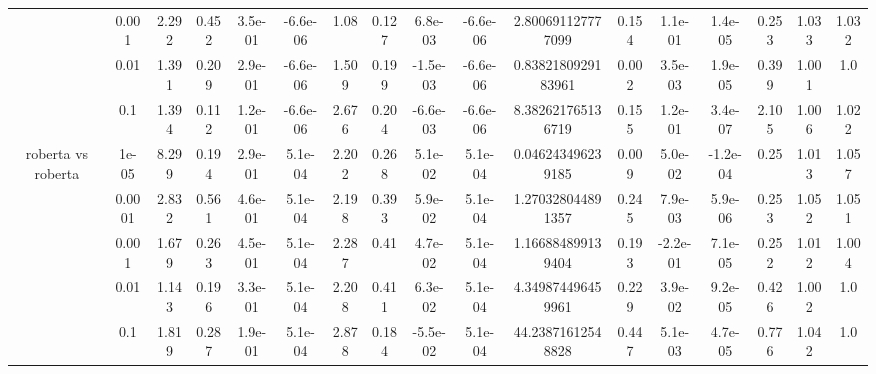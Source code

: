 \begin{tabular}{|c|c|c|c|c|c|c|c|c|c|c|c|c|c|c|c|c|}
 & 0.001 & 2.292 & 0.452 & 3.5e-01 & -6.6e-06 & 1.08 & 0.127 & 6.8e-03 & -6.6e-06 & 2.800691127777099 & 0.154 & 1.1e-01 & 1.4e-05 & 0.253 & 1.033 & 1.032 \\
 & 0.01 & 1.391 & 0.209 & 2.9e-01 & -6.6e-06 & 1.509 & 0.199 & -1.5e-03 & -6.6e-06 & 0.8382180929183961 & 0.002 & 3.5e-03 & 1.9e-05 & 0.399 & 1.001 & 1.0 \\
 & 0.1 & 1.394 & 0.112 & 1.2e-01 & -6.6e-06 & 2.676 & 0.204 & -6.6e-03 & -6.6e-06 & 8.382621765136719 & 0.155 & 1.2e-01 & 3.4e-07 & 2.105 & 1.006 & 1.022 \\
\hline
\multirow{5}{*}{roberta  vs roberta } & 1e-05 & 8.299 & 0.194 & 2.9e-01 & 5.1e-04 & 2.202 & 0.268 & 5.1e-02 & 5.1e-04 & 0.046243496239185 & 0.009 & 5.0e-02 & -1.2e-04 & 0.25 & 1.013 & 1.057 \\
 & 0.0001 & 2.832 & 0.561 & 4.6e-01 & 5.1e-04 & 2.198 & 0.393 & 5.9e-02 & 5.1e-04 & 1.270328044891357 & 0.245 & 7.9e-03 & 5.9e-06 & 0.253 & 1.052 & 1.051 \\
 & 0.001 & 1.679 & 0.263 & 4.5e-01 & 5.1e-04 & 2.287 & 0.41 & 4.7e-02 & 5.1e-04 & 1.166884899139404 & 0.193 & -2.2e-01 & 7.1e-05 & 0.252 & 1.012 & 1.004 \\
 & 0.01 & 1.143 & 0.196 & 3.3e-01 & 5.1e-04 & 2.208 & 0.411 & 6.3e-02 & 5.1e-04 & 4.349874496459961 & 0.229 & 3.9e-02 & 9.2e-05 & 0.426 & 1.002 & 1.0 \\
 & 0.1 & 1.819 & 0.287 & 1.9e-01 & 5.1e-04 & 2.878 & 0.184 & -5.5e-02 & 5.1e-04 & 44.23871612548828 & 0.447 & 5.1e-03 & 4.7e-05 & 0.776 & 1.042 & 1.0 \\
\hline
\end{tabular}